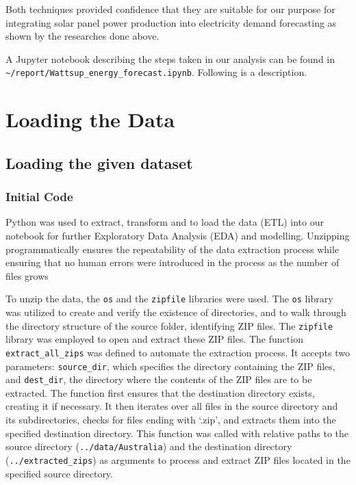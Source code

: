 \documentclass[
]{article}
\begin{document}
Both techniques provided confidence that they are suitable for our
purpose for integrating solar panel power production into electricity
demand forecasting as shown by the researches done above.

A Jupyter notebook describing the steps taken in our analysis can be
found in
\texttt{\textasciitilde{}/report/Wattsup\_energy\_forecast.ipynb}.
Following is a description.

\section{Loading the Data}\label{loading-the-data}

\subsection{Loading the given dataset}\label{loading-the-given-dataset}

\subsubsection{Initial Code}\label{initial-code}

Python was used to extract, transform and to load the data (ETL) into
our notebook for further Exploratory Data Analysis (EDA) and modelling.
Unzipping programmatically ensures the repeatability of the data
extraction process while ensuring that no human errors were introduced
in the process as the number of files grows

To unzip the data, the \texttt{os} and the \texttt{zipfile} libraries
were used. The \texttt{os} library was utilized to create and verify the
existence of directories, and to walk through the directory structure of
the source folder, identifying ZIP files. The \texttt{zipfile} library
was employed to open and extract these ZIP files. The function
\texttt{extract\_all\_zips} was defined to automate the extraction
process. It accepts two parameters: \texttt{source\_dir}, which
specifies the directory containing the ZIP files, and
\texttt{dest\_dir}, the directory where the contents of the ZIP files
are to be extracted. The function first ensures that the destination
directory exists, creating it if necessary. It then iterates over all
files in the source directory and its subdirectories, checks for files
ending with `.zip', and extracts them into the specified destination
directory. This function was called with relative paths to the source
directory
(\texttt{\textquotesingle{}../data/Australia\textquotesingle{}}) and the
destination directory
(\texttt{\textquotesingle{}../extracted\_zips\textquotesingle{}}) as
arguments to process and extract ZIP files located in the specified
source directory.
\end{document}
